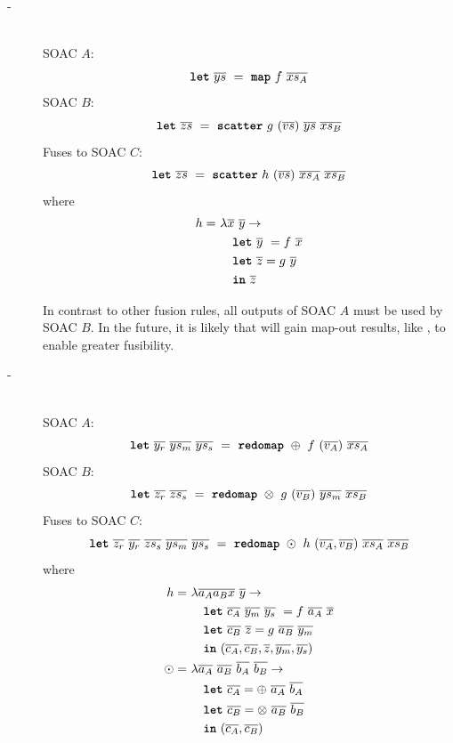 \begin{description}
\item[-]\hfill\\

  SOAC $A$:
  \[
    \mbox{\texttt{\bfseries{let}}}~\overline{ys}~=~\mbox{\texttt{\bfseries{map}}}~f~\overline{xs_{A}}
  \]
  SOAC $B$:
  \[
    \mbox{\texttt{\bfseries{let}}}~\overline{zs}~=~\mbox{\texttt{\bfseries{scatter}}}~g~(\overline{vs})~\overline{ys}~\overline{xs_{B}}
  \]
  Fuses to SOAC $C$:
  \[
    \mbox{\texttt{\bfseries{let}}}~\overline{zs}~=~\mbox{\texttt{\bfseries{scatter}}}~h~(\overline{vs})~\overline{xs_{A}}~\overline{xs_{B}}
  \]
  where
  \begin{align*}
    h =~& \lambda \overline{x}~\overline{y} \rightarrow \\
      & \quad \mbox{\texttt{\bfseries{let}}}~\overline{y}~ = f~\overline{x} \\
      & \quad \mbox{\texttt{\bfseries{let}}}~\overline{z} = g~\overline{y} \\
      & \quad \mbox{\texttt{\bfseries{in}}}~\overline{z}
  \end{align*}

  In contrast to other fusion rules, all outputs of SOAC $A$ must be
  used by SOAC $B$.  In the future, it is likely that 
  will gain map-out results, like , to enable greater
  fusibility.

\item[-]\hfill\\

  SOAC $A$:
  \[
    \mbox{\texttt{\bfseries{let}}}~\overline{y_{r}}~\overline{ys_{m}}~\overline{ys_{s}}~=~\mbox{\texttt{\bfseries{redomap}}}~\oplus~f~(\overline{v_{A}})~\overline{xs_{A}}
  \]
  SOAC $B$:
  \[
    \mbox{\texttt{\bfseries{let}}}~\overline{z_{r}}~\overline{zs_{s}}~=~\mbox{\texttt{\bfseries{redomap}}}~\otimes~g~(\overline{v_{B}})~\overline{ys_{m}}~\overline{xs_{B}}
  \]
  Fuses to SOAC $C$:
  \[
    \mbox{\texttt{\bfseries{let}}}~\overline{z_{r}}~\overline{y_{r}}~\overline{zs_{s}}~\overline{ys_{m}}~\overline{ys_{s}}~=~\mbox{\texttt{\bfseries{redomap}}}~\odot~h~(\overline{v_{A}},\overline{v_{B}})~\overline{xs_{A}}~\overline{xs_{B}}
  \]
where
  \begin{align*}
    h =~& \lambda \overline{a_{A}} \overline{a_{B}} \overline{x}~\overline{y} \rightarrow \\
      & \quad \mbox{\texttt{\bfseries{let}}}~\overline{c_{A}}~\overline{y_{m}}~\overline{y_{s}}~ = f~\overline{a_{A}}~\overline{x} \\
      & \quad \mbox{\texttt{\bfseries{let}}}~\overline{c_{B}}~\overline{z} = g~\overline{a_{B}}~\overline{y_{m}} \\
        & \quad \mbox{\texttt{\bfseries{in}}}~(\overline{c_{A}},\overline{c_{B}},\overline{z},\overline{y_{m}},\overline{y_{s}}) \\
    \odot =~& \lambda \overline{a_{A}}~\overline{a_{B}}~\overline{b_{A}}~\overline{b_{B}} \rightarrow \\
        & \quad \mbox{\texttt{\bfseries{let}}}~\overline{c_{A}} = \oplus~\overline{a_{A}}~\overline{b_{A}} \\
        & \quad \mbox{\texttt{\bfseries{let}}}~\overline{c_{B}} = \otimes~\overline{a_{B}}~\overline{b_{B}} \\
        & \quad \mbox{\texttt{\bfseries{in}}}~(\overline{c_{A}}, \overline{c_{B}})
  \end{align*}


\end{description}
